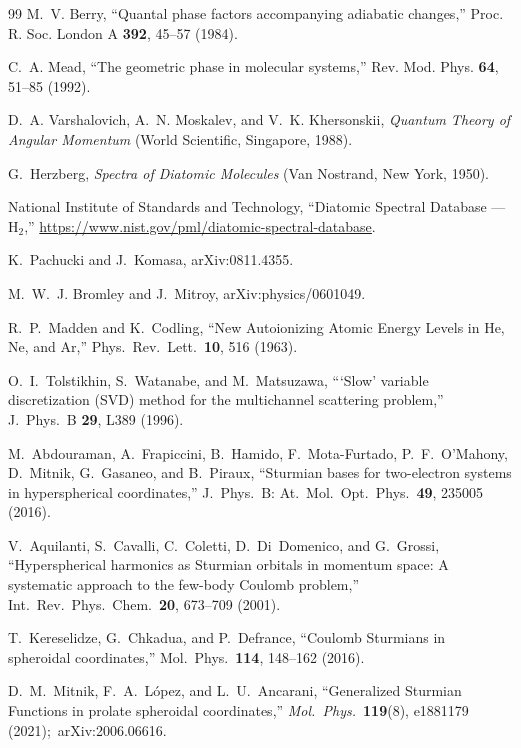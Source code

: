 \documentclass[aps,pra,twocolumn,superscriptaddress,longbibliography]{revtex4-2}
\begin{document}
\begin{thebibliography}{99}
M.~V. Berry,
``Quantal phase factors accompanying adiabatic changes,''
Proc. R. Soc. London A \textbf{392}, 45--57 (1984).

C.~A. Mead,
``The geometric phase in molecular systems,''
Rev. Mod. Phys. \textbf{64}, 51--85 (1992).

D.~A. Varshalovich, A.~N. Moskalev, and V.~K. Khersonskii,
\textit{Quantum Theory of Angular Momentum}
(World Scientific, Singapore, 1988).

G.~Herzberg,
\textit{Spectra of Diatomic Molecules}
(Van Nostrand, New York, 1950).

National Institute of Standards and Technology,
``Diatomic Spectral Database --- H$_2$,''
\url{https://www.nist.gov/pml/diatomic-spectral-database}.

K.~Pachucki and J.~Komasa, arXiv:0811.4355.

M.~W.~J. Bromley and J.~Mitroy, arXiv:physics/0601049.

R.~P.~Madden and K.~Codling,
``New Autoionizing Atomic Energy Levels in He, Ne, and Ar,''
Phys.\ Rev.\ Lett.\ \textbf{10}, 516 (1963).

O.~I.~Tolstikhin, S.~Watanabe, and M.~Matsuzawa,
```Slow' variable discretization (SVD) method for the multichannel
scattering problem,''
J.\ Phys.\ B \textbf{29}, L389 (1996).

M.~Abdouraman, A.~Frapiccini, B.~Hamido, F.~Mota-Furtado,
P.~F.~O'Mahony, D.~Mitnik, G.~Gasaneo, and B.~Piraux,
``Sturmian bases for two-electron systems in hyperspherical
coordinates,''
J.\ Phys.\ B: At.\ Mol.\ Opt.\ Phys.\ \textbf{49}, 235005 (2016).

V.~Aquilanti, S.~Cavalli, C.~Coletti, D.~Di~Domenico, and G.~Grossi,
``Hyperspherical harmonics as Sturmian orbitals in momentum space:
A systematic approach to the few-body Coulomb problem,''
Int.\ Rev.\ Phys.\ Chem.\ \textbf{20}, 673--709 (2001).

T.~Kereselidze, G.~Chkadua, and P.~Defrance,
``Coulomb Sturmians in spheroidal coordinates,''
Mol.\ Phys.\ \textbf{114}, 148--162 (2016).

D.~M.~Mitnik, F.~A.~L\'opez, and L.~U.~Ancarani,
``Generalized Sturmian Functions in prolate spheroidal coordinates,'' \textit{Mol.\ Phys.}\ \textbf{119}(8), e1881179 (2021);\ arXiv:2006.06616.

\end{thebibliography}
\end{document}
